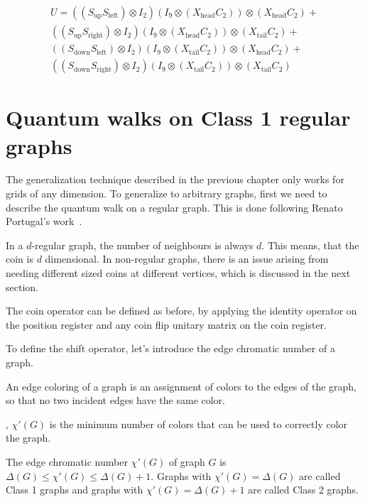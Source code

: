 \begin{align}
   U =
   ((S_{\text{up}}  S_{\text{left}}) \otimes I_2) (I_9 \otimes (X_{\text{head}}C_2)) \otimes (X_{\text{head}}C_2) + \\
   ((S_{\text{up}}  S_{\text{right}}) \otimes I_2) (I_9 \otimes (X_{\text{head}}C_2)) \otimes (X_{\text{tail}}C_2) + \\
   ((S_{\text{down}}  S_{\text{left}}) \otimes I_2) (I_9 \otimes (X_{\text{tail}}C_2)) \otimes (X_{\text{head}}C_2) + \\
   ((S_{\text{down}}  S_{\text{right}}) \otimes I_2) (I_9 \otimes (X_{\text{tail}}C_2)) \otimes (X_{\text{tail}}C_2)
\end{align}

\section{Quantum walks on Class 1 regular graphs}

The generalization technique described in the previous chapter only works for grids of any dimension. To generalize to arbitrary graphs, first we need to describe the quantum walk on a regular graph. This is done following Renato Portugal's work~\cite{Portugal}.

In a $d$-regular graph, the number of neighbours is always $d$. This means, that the coin is $d$ dimensional. In non-regular graphs, there is an issue arising from needing different sized coins at different vertices, which is discussed in the next section.

The coin operator can be defined as before, by applying the identity operator on the position register and any coin flip unitary matrix on the coin register.

To define the shift operator, let's introduce the edge chromatic number of a graph.



An edge coloring of a graph is an assignment of colors to the edges of the graph, so that no two incident edges have the same color.

, $\chi'(G)$ is the minimum number of colors that can be used to correctly color the graph.


The edge chromatic number $\chi'(G)$ of graph $G$ is $\Delta(G) \leq{} \chi'(G) \leq{} \Delta(G)+1$. Graphs with $\chi'(G) = \Delta(G)$ are called Class 1 graphs and graphs with $\chi'(G) = \Delta(G)+1$ are called Class 2 graphs.


